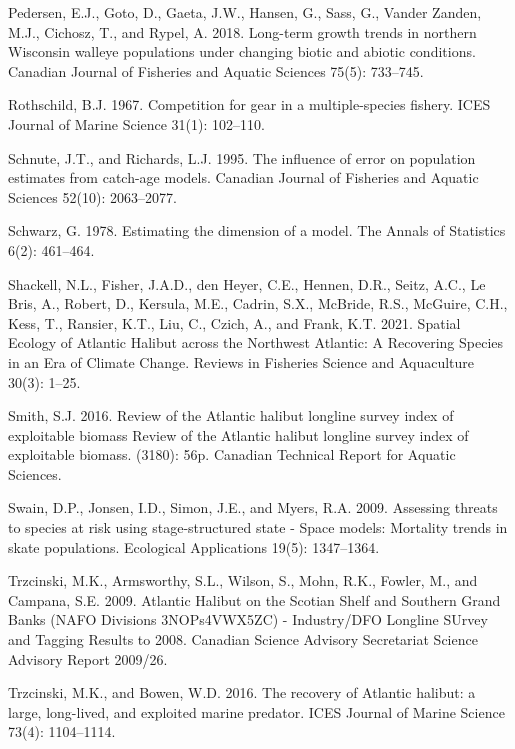 \documentclass[12pt]{article}\usepackage[]{graphicx}\usepackage[]{color}
\begin{document}
\leavevmode\hypertarget{ref-Pedersen2018}{}%
Pedersen, E.J., Goto, D., Gaeta, J.W., Hansen, G., Sass, G., Vander Zanden, M.J., Cichosz, T., and Rypel, A. 2018. Long-term growth trends in northern Wisconsin walleye populations under changing biotic and abiotic conditions. Canadian Journal of Fisheries and Aquatic Sciences 75(5): 733--745.

\leavevmode\hypertarget{ref-Rothschild1967}{}%
Rothschild, B.J. 1967. Competition for gear in a multiple-species fishery. ICES Journal of Marine Science 31(1): 102--110.

\leavevmode\hypertarget{ref-Schnute1995}{}%
Schnute, J.T., and Richards, L.J. 1995. The influence of error on population estimates from catch-age models. Canadian Journal of Fisheries and Aquatic Sciences 52(10): 2063--2077.

\leavevmode\hypertarget{ref-Schwarz1978}{}%
Schwarz, G. 1978. Estimating the dimension of a model. The Annals of Statistics 6(2): 461--464.

\leavevmode\hypertarget{ref-Shackell2021}{}%
Shackell, N.L., Fisher, J.A.D., den Heyer, C.E., Hennen, D.R., Seitz, A.C., Le Bris, A., Robert, D., Kersula, M.E., Cadrin, S.X., McBride, R.S., McGuire, C.H., Kess, T., Ransier, K.T., Liu, C., Czich, A., and Frank, K.T. 2021. Spatial Ecology of Atlantic Halibut across the Northwest Atlantic: A Recovering Species in an Era of Climate Change. Reviews in Fisheries Science and Aquaculture 30(3): 1--25.

\leavevmode\hypertarget{ref-Smith2016a}{}%
Smith, S.J. 2016. Review of the Atlantic halibut longline survey index of exploitable biomass Review of the Atlantic halibut longline survey index of exploitable biomass. (3180): 56p. Canadian Technical Report for Aquatic Sciences.

\leavevmode\hypertarget{ref-Swain2009}{}%
Swain, D.P., Jonsen, I.D., Simon, J.E., and Myers, R.A. 2009. Assessing threats to species at risk using stage-structured state - Space models: Mortality trends in skate populations. Ecological Applications 19(5): 1347--1364.

\leavevmode\hypertarget{ref-Trzcinski2009}{}%
Trzcinski, M.K., Armsworthy, S.L., Wilson, S., Mohn, R.K., Fowler, M., and Campana, S.E. 2009. Atlantic Halibut on the Scotian Shelf and Southern Grand Banks (NAFO Divisions 3NOPs4VWX5ZC) - Industry/DFO Longline SUrvey and Tagging Results to 2008. Canadian Science Advisory Secretariat Science Advisory Report 2009/26.

\leavevmode\hypertarget{ref-Trzcinski2016}{}%
Trzcinski, M.K., and Bowen, W.D. 2016. The recovery of Atlantic halibut: a large, long-lived, and exploited marine predator. ICES Journal of Marine Science 73(4): 1104--1114.
\end{document}
